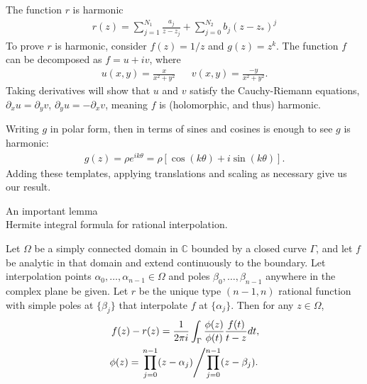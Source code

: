 \documentclass{seminar}
\begin{document}
\begin{slide} %
\large The function $r$ is harmonic 
\small
\begin{align*}
r(z)= \sum_{j=1}^{N_1} \frac{a_j}{z-z_j} + \sum_{j=0}^{N_2} b_j (z-z_*)^j
\end{align*}
To prove $r$ is harmonic, consider $f(z)=1/z$ and $g(z)=z^k$.
The function $f$ can be decomposed as $f=u+iv$, where
\begin{align*}
u(x,y)=\frac{x}{x^2+y^2} &&
v(x,y)=\frac{-y}{x^2+y^2}.
\end{align*}
Taking derivatives will show that $u$ and $v$ satisfy the Cauchy-Riemann equations, ${\partial}_x u={\partial}_y v$, ${\partial}_y u=-{\partial}_x v$, meaning $f$ is (holomorphic, and thus) harmonic.

Writing $g$ in polar form, then in terms of sines and cosines is enough to see $g$ is harmonic:
\begin{align*}
g(z)=\rho e^{i k \theta} = \rho [\cos{(k\theta)} + i \sin{(k\theta)}] .
\end{align*}
Adding these templates, applying translations and scaling as necessary give us our result.
\end{slide} %




\begin{slide} %
\large An important lemma \\

\small
Hermite integral formula for rational interpolation.

Let $\Omega$ be a simply connected domain in $\mathds{C}$ bounded by a closed curve $\Gamma$, and let $f$ be analytic in that domain and extend continuously to the boundary. Let interpolation points ${\alpha}_0, \ldots ,{\alpha}_{n-1} \in \Omega$ and poles ${\beta}_0, \ldots ,{\beta}_{n-1}$ anywhere in the complex plane be given. Let $r$ be the unique type $(n-1,n)$ rational function with simple poles at $\{{\beta}_j\}$ that interpolate $f$ at $\{{\alpha}_j\}$. Then for any $z \in \Omega$,
\begin{align*}
f(z)-r(z)=\frac{1}{2 \pi i} \int_{\Gamma} \frac{\phi (z)}{\phi (t)} \frac{f(t)}{t-z}dt, \\
\phi (z) = \left. \prod_{j=0}^{n-1}(z-{\alpha}_j) \middle/ \prod_{j=0}^{n-1}(z-{\beta}_j). \right.
\end{align*}
\end{slide} %
\end{document}

